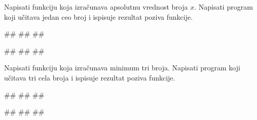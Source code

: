 \begin{Exercise}[label=p1.4_02] 
Napisati funkciju  koja
izračunava apsolutnu vrednost broja $x$. Napisati program koji
učitava jedan ceo broj i ispisuje rezultat poziva funkcije.

\begin{miditest}
\begin{upotreba}{1}
#\naslovInt#
##
##
\end{upotreba}
\end{miditest}
\begin{miditest}
\begin{upotreba}{2}
#\naslovInt#
##
##
\end{upotreba}
\end{miditest}

\end{Exercise}
\begin{Answer}[ref=p1.4_02]
\end{Answer}


\begin{Exercise}[label=p1.4_01] 
Napisati funkciju  koja izračunava
minimum tri broja. Napisati program koji učitava tri cela broja i
ispisuje rezultat poziva funkcije.

\begin{miditest}
\begin{upotreba}{1}
#\naslovInt#
##
##
\end{upotreba}
\end{miditest}
\begin{miditest}
\begin{upotreba}{2}
#\naslovInt#
##
##
\end{upotreba}
\end{miditest}
\end{Exercise}
\begin{Answer}[ref=p1.4_01]
\end{Answer}



